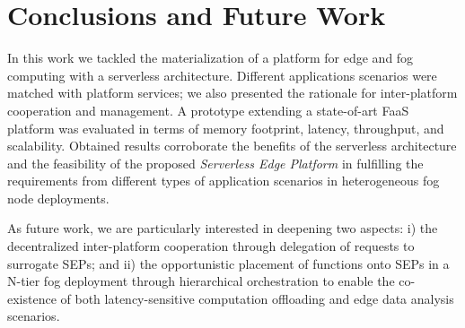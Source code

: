 \section{Conclusions and Future Work}\label{sec:conclusions}

In this work we tackled the materialization of a platform for edge and fog computing with a serverless architecture. Different applications scenarios were matched with platform services; we also presented the rationale for inter-platform cooperation and management. A prototype extending a state-of-art FaaS platform was evaluated in terms of memory footprint, latency, throughput, and scalability. Obtained results corroborate the benefits of the serverless architecture and the feasibility of the proposed \textit{Serverless Edge Platform} in fulfilling the requirements from different types of application scenarios in heterogeneous fog node deployments.

As future work, we are particularly interested in deepening 
two aspects: i) the decentralized inter-platform cooperation through delegation of requests to surrogate SEPs; and ii) the opportunistic placement of functions onto SEPs in a N-tier fog deployment through hierarchical orchestration to enable the co-existence of both latency-sensitive computation offloading and edge data analysis scenarios. 